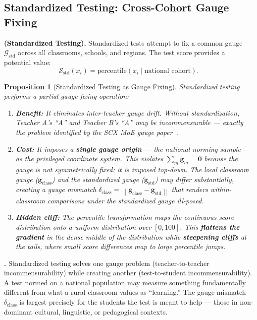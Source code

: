 \documentclass[11pt,a4paper]{article}
\newtheorem{proposition}[theorem]{Proposition}
\newcommand{\cS}{\mathcal{S}}
\newcommand{\cG}{\mathcal{G}}
\newcommand{\norm}[1]{\left\lVert#1\right\rVert}
\newcommand{\sumgd}{\sum_m \mathbf{g}_m = \mathbf{0}}
\begin{document}
\subsection{Standardized Testing: Cross-Cohort Gauge Fixing}
\textbf{ (Standardized Testing).} Standardized tests attempt to fix a common gauge $\cG_{\text{std}}$ across all classrooms, schools, and regions. The test score provides a potential value:
\begin{equation}
    \cS_{\text{std}}(x_i) = \text{percentile}(x_i \mid \text{national cohort}).
\end{equation}
\begin{proposition}[Standardized Testing as Gauge Fixing]
\label{prop:standardized}
Standardized testing performs a partial gauge-fixing operation:
\begin{enumerate}[label=(\roman*)]
    \item \textbf{Benefit:} It eliminates inter-teacher gauge drift. Without standardization, Teacher A's ``A'' and Teacher B's ``A'' may be incommensurable — exactly the problem identified by the SCX MoE gauge paper~\cite{scx_moe_gauge}.
    \item \textbf{Cost:} It imposes a \textbf{single gauge origin} — the national norming sample — as the privileged coordinate system. This violates $\sumgd$ because the gauge is not symmetrically fixed: it is imposed top-down. The local classroom gauge ($\mathbf{g}_{\text{class}}$) and the standardized gauge ($\mathbf{g}_{\text{std}}$) may differ substantially, creating a gauge mismatch $\delta_{\text{class}} = \norm{\mathbf{g}_{\text{class}} - \mathbf{g}_{\text{std}}}$ that renders within-classroom comparisons under the standardized gauge ill-posed.
    \item \textbf{Hidden cliff:} The percentile transformation maps the continuous score distribution onto a uniform distribution over $[0,100]$. This \textbf{flattens the gradient} in the dense middle of the distribution while \textbf{steepening cliffs} at the tails, where small score differences map to large percentile jumps.
\end{enumerate}
\end{proposition}
\textbf{.}
Standardized testing solves one gauge problem (teacher-to-teacher incommensurability) while creating another (test-to-student incommensurability). A test normed on a national population may measure something fundamentally different from what a rural classroom values as ``learning.'' The gauge mismatch $\delta_{\text{class}}$ is largest precisely for the students the test is meant to help — those in non-dominant cultural, linguistic, or pedagogical contexts.
\end{document}
